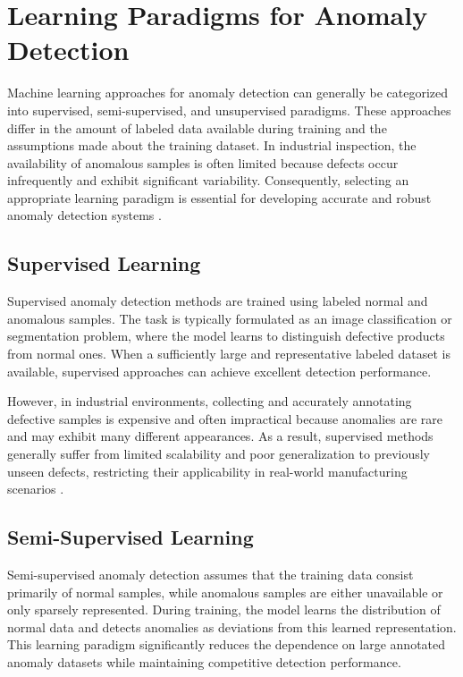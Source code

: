 \documentclass[12pt,openany,oneside]{book}
\begin{document}
\section{Learning Paradigms for Anomaly Detection}

Machine learning approaches for anomaly detection can generally be categorized into supervised, semi-supervised, and unsupervised paradigms. These approaches differ in the amount of labeled data available during training and the assumptions made about the training dataset. In industrial inspection, the availability of anomalous samples is often limited because defects occur infrequently and exhibit significant variability. Consequently, selecting an appropriate learning paradigm is essential for developing accurate and robust anomaly detection systems \cite{liu2024survey,bergmann2019mvtec}.
\subsection{Supervised Learning}

Supervised anomaly detection methods are trained using labeled normal and anomalous samples. The task is typically formulated as an image classification or segmentation problem, where the model learns to distinguish defective products from normal ones. When a sufficiently large and representative labeled dataset is available, supervised approaches can achieve excellent detection performance.

However, in industrial environments, collecting and accurately annotating defective samples is expensive and often impractical because anomalies are rare and may exhibit many different appearances. As a result, supervised methods generally suffer from limited scalability and poor generalization to previously unseen defects, restricting their applicability in real-world manufacturing scenarios \cite{liu2024survey}.
\subsection{Semi-Supervised Learning}

Semi-supervised anomaly detection assumes that the training data consist primarily of normal samples, while anomalous samples are either unavailable or only sparsely represented. During training, the model learns the distribution of normal data and detects anomalies as deviations from this learned representation. This learning paradigm significantly reduces the dependence on large annotated anomaly datasets while maintaining competitive detection performance.
\end{document}
